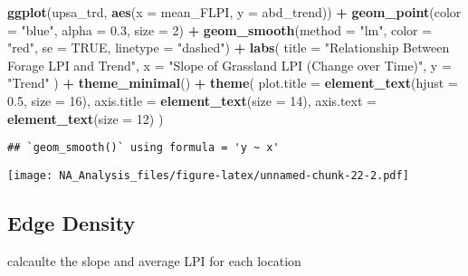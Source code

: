 \documentclass[
]{article}
\newenvironment{Shaded}{\begin{snugshade}}{\end{snugshade}}
\newcommand{\AttributeTok}[1]{\textcolor[rgb]{0.13,0.29,0.53}{#1}}
\newcommand{\ConstantTok}[1]{\textcolor[rgb]{0.56,0.35,0.01}{#1}}
\newcommand{\DecValTok}[1]{\textcolor[rgb]{0.00,0.00,0.81}{#1}}
\newcommand{\FloatTok}[1]{\textcolor[rgb]{0.00,0.00,0.81}{#1}}
\newcommand{\FunctionTok}[1]{\textcolor[rgb]{0.13,0.29,0.53}{\textbf{#1}}}
\newcommand{\NormalTok}[1]{#1}
\newcommand{\SpecialCharTok}[1]{\textcolor[rgb]{0.81,0.36,0.00}{\textbf{#1}}}
\newcommand{\StringTok}[1]{\textcolor[rgb]{0.31,0.60,0.02}{#1}}
\begin{document}
\begin{Shaded}
\begin{Highlighting}[]
\FunctionTok{ggplot}\NormalTok{(upsa\_trd, }\FunctionTok{aes}\NormalTok{(}\AttributeTok{x =}\NormalTok{ mean\_FLPI, }\AttributeTok{y =}\NormalTok{ abd\_trend)) }\SpecialCharTok{+}
  \FunctionTok{geom\_point}\NormalTok{(}\AttributeTok{color =} \StringTok{"blue"}\NormalTok{, }\AttributeTok{alpha =} \FloatTok{0.3}\NormalTok{, }\AttributeTok{size =} \DecValTok{2}\NormalTok{) }\SpecialCharTok{+}  
  \FunctionTok{geom\_smooth}\NormalTok{(}\AttributeTok{method =} \StringTok{"lm"}\NormalTok{, }\AttributeTok{color =} \StringTok{"red"}\NormalTok{, }\AttributeTok{se =} \ConstantTok{TRUE}\NormalTok{, }\AttributeTok{linetype =} \StringTok{"dashed"}\NormalTok{) }\SpecialCharTok{+} 
  \FunctionTok{labs}\NormalTok{(}
    \AttributeTok{title =} \StringTok{"Relationship Between Forage LPI and Trend"}\NormalTok{,}
    \AttributeTok{x =} \StringTok{"Slope of Grassland LPI (Change over Time)"}\NormalTok{,}
    \AttributeTok{y =} \StringTok{"Trend"}
\NormalTok{  ) }\SpecialCharTok{+}
  \FunctionTok{theme\_minimal}\NormalTok{() }\SpecialCharTok{+}
  \FunctionTok{theme}\NormalTok{(}
    \AttributeTok{plot.title =} \FunctionTok{element\_text}\NormalTok{(}\AttributeTok{hjust =} \FloatTok{0.5}\NormalTok{, }\AttributeTok{size =} \DecValTok{16}\NormalTok{),}
    \AttributeTok{axis.title =} \FunctionTok{element\_text}\NormalTok{(}\AttributeTok{size =} \DecValTok{14}\NormalTok{),}
    \AttributeTok{axis.text =} \FunctionTok{element\_text}\NormalTok{(}\AttributeTok{size =} \DecValTok{12}\NormalTok{)}
\NormalTok{  )}
\end{Highlighting}
\end{Shaded}

\begin{verbatim}
## `geom_smooth()` using formula = 'y ~ x'
\end{verbatim}

\texttt{[image: NA\_Analysis\_files/figure-latex/unnamed-chunk-22-2.pdf]}

\subsection{Edge Density}\label{edge-density}

calcaulte the slope and average LPI for each location
\end{document}
